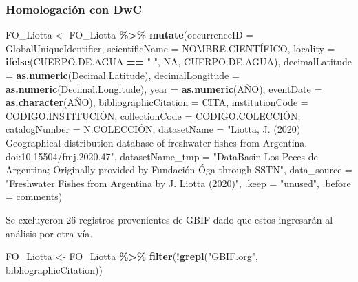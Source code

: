 \documentclass[sn-apa,pdflatex]{sn-jnl}
\newenvironment{Shaded}{\begin{snugshade}}{\end{snugshade}}
\newcommand{\AttributeTok}[1]{\textcolor[rgb]{0.13,0.29,0.53}{#1}}
\newcommand{\ConstantTok}[1]{\textcolor[rgb]{0.56,0.35,0.01}{#1}}
\newcommand{\FunctionTok}[1]{\textcolor[rgb]{0.13,0.29,0.53}{\textbf{#1}}}
\newcommand{\NormalTok}[1]{#1}
\newcommand{\OtherTok}[1]{\textcolor[rgb]{0.56,0.35,0.01}{#1}}
\newcommand{\SpecialCharTok}[1]{\textcolor[rgb]{0.81,0.36,0.00}{\textbf{#1}}}
\newcommand{\StringTok}[1]{\textcolor[rgb]{0.31,0.60,0.02}{#1}}
\begin{document}
\subsubsection{Homologación con DwC}\label{homologaciuxf3n-con-dwc}

\begin{Shaded}
\begin{Highlighting}[]
\NormalTok{FO\_Liotta }\OtherTok{\textless{}{-}}\NormalTok{ FO\_Liotta }\SpecialCharTok{\%\textgreater{}\%}
    \FunctionTok{mutate}\NormalTok{(}\AttributeTok{occurrenceID =}\NormalTok{ GlobalUniqueIdentifier, }\AttributeTok{scientificName =}\NormalTok{ NOMBRE.CIENTÍFICO,}
        \AttributeTok{locality =} \FunctionTok{ifelse}\NormalTok{(CUERPO.DE.AGUA }\SpecialCharTok{==} \StringTok{"{-}"}\NormalTok{, }\ConstantTok{NA}\NormalTok{, CUERPO.DE.AGUA),}
        \AttributeTok{decimalLatitude =} \FunctionTok{as.numeric}\NormalTok{(Decimal.Latitude), }\AttributeTok{decimalLongitude =} \FunctionTok{as.numeric}\NormalTok{(Decimal.Longitude),}
        \AttributeTok{year =} \FunctionTok{as.numeric}\NormalTok{(AÑO), }\AttributeTok{eventDate =} \FunctionTok{as.character}\NormalTok{(AÑO),}
        \AttributeTok{bibliographicCitation =}\NormalTok{ CITA, }\AttributeTok{institutionCode =}\NormalTok{ CODIGO.INSTITUCIÓN,}
        \AttributeTok{collectionCode =}\NormalTok{ CODIGO.COLECCIÓN, }\AttributeTok{catalogNumber =}\NormalTok{ N.COLECCIÓN,}
        \AttributeTok{datasetName =} \StringTok{"Liotta, J. (2020) Geographical distribution database of freshwater fishes from Argentina. doi:10.15504/fmj.2020.47"}\NormalTok{,}
        \AttributeTok{datasetName\_tmp =} \StringTok{"DataBasin{-}Los Peces de Argentina; Originally provided by Fundación Óga through SSTN"}\NormalTok{,}
        \AttributeTok{data\_source =} \StringTok{"Freshwater Fishes from Argentina by J. Liotta (2020)"}\NormalTok{,}
        \AttributeTok{.keep =} \StringTok{"unused"}\NormalTok{, }\AttributeTok{.before =}\NormalTok{ comments)}
\end{Highlighting}
\end{Shaded}

Se excluyeron 26 registros provenientes de GBIF dado que estos
ingresarán al análisis por otra vía.

\begin{Shaded}
\begin{Highlighting}[]
\NormalTok{FO\_Liotta }\OtherTok{\textless{}{-}}\NormalTok{ FO\_Liotta }\SpecialCharTok{\%\textgreater{}\%}
    \FunctionTok{filter}\NormalTok{(}\SpecialCharTok{!}\FunctionTok{grepl}\NormalTok{(}\StringTok{"GBIF.org"}\NormalTok{, bibliographicCitation))}
\end{Highlighting}
\end{Shaded}
\end{document}
